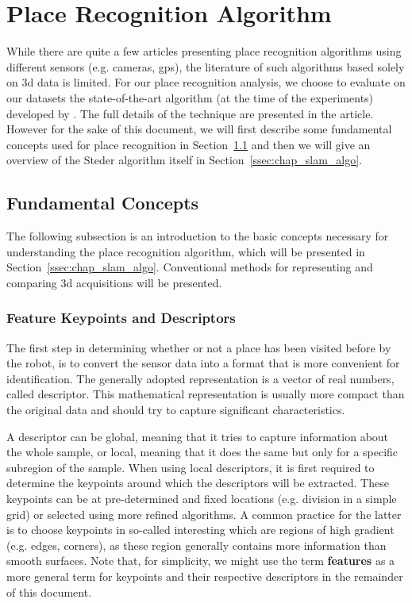 \section{Place Recognition Algorithm}
\label{sec:chap_slam_algo}

While there are quite a few articles presenting place recognition algorithms using different sensors (e.g. cameras, \gls*{gps}), the literature of such algorithms based solely on \gls*{3d} data is limited. For our place recognition analysis, we choose to evaluate on our datasets the state-of-the-art algorithm (at the time of the experiments) developed by \citet{Steder2011b}. The full details of the technique are presented in the article. However for the sake of this document, we will first describe some fundamental concepts used for place recognition in Section~\ref{ssec:chap_slam_basics} and then we will give an overview of the Steder algorithm itself in Section~\ref{ssec:chap_slam_algo}.


\subsection{Fundamental Concepts}
\label{ssec:chap_slam_basics}

The following subsection is an introduction to the basic concepts necessary for understanding the place recognition algorithm, which will be presented in Section~\ref{ssec:chap_slam_algo}. Conventional methods for representing and comparing \gls*{3d} acquisitions will be presented.

\subsubsection{Feature Keypoints and Descriptors}
\label{ssub:feature_keypoints_and_descriptors}

The first step in determining whether or not a place has been visited before by the robot, is to convert the sensor data into a format that is more convenient for identification. The generally adopted representation is a vector of real numbers, called descriptor. This mathematical representation is usually more compact than the original data and should try to capture significant characteristics.

A descriptor can be global, meaning that it tries to capture information about the whole sample, or local, meaning that it does the same but only for a specific subregion of the sample. When using local descriptors, it is first required to determine the keypoints around which the descriptors will be extracted. These keypoints can be at pre-determined and fixed locations (e.g. division in a simple grid) or selected using more refined algorithms. A common practice for the latter is to choose keypoints in so-called interesting which are regions of high gradient (e.g. edges, corners), as these region generally contains more information than smooth surfaces. Note that, for simplicity, we might use the term \textbf{features} as a more general term for keypoints and their respective descriptors in the remainder of this document.

